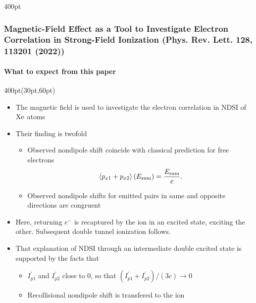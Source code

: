 \begin{frame}
\begin{textblock*}{400pt}
\end{textblock*}

%

\end{frame}


\begin{frame}
\frametitle{Magnetic-Field Effect as a Tool to Investigate 
Electron Correlation in Strong-Field Ionization
\small (Phys. Rev. Lett. 128, 113201 (2022))}
\framesubtitle{What to expect from this paper}

\small
\begin{textblock*}{400pt}(30pt,60pt)
\begin{itemize}
\item The magnetic field is used to investigate the electron correlation
in NDSI of $\rm Xe$ atoms
\vspace{10pt}
\item Their finding is twofold
\begin{itemize}
\item[$\bullet$] Observed nondipole shift coincide with classical prediction
for free electrons
 $$ 
   \left\langle p_{x1} + p_{x2} \right\rangle (E_{\rm sum})= 
      \frac{E_{\rm sum}}{c}.
 $$
\item[$\bullet$] Observed nondipole shifts for emitted pairs in same 
and opposite directions are congruent
\end{itemize}
\item Here, returning $e^{-}$ is recaptured by the ion in an excited state, 
exciting the other.
Subsequent double tunnel ionization follows. 
\item That explanation of NDSI through an intermediate double excited state
is supported by  the facts that
\begin{itemize}
\item[$\bullet$] $I_{p1}^\prime$ and $I_{p2}^\prime$ close to 0, 
so that $(I_{p1}^\prime + I_{p2}^\prime)/(3c) \longrightarrow 0$ 
\item[$\bullet$] Recollisional nondipole shift is transfered to the ion
\end{itemize}
\end{itemize}

\end{textblock*}

\end{frame}


